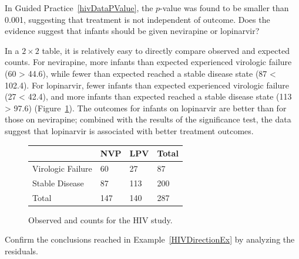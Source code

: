 
\begin{examplewrap}
\begin{nexample}{In Guided Practice~\ref{hivDataPValue}, the $p$-value was found to be smaller than 0.001, suggesting that treatment is not independent of outcome. Does the evidence suggest that infants should be given nevirapine or lopinarvir?}\label{HIVDirectionEx}%

In a $2 \times 2$ table, it is relatively easy to directly compare observed and expected counts. 
For nevirapine, more infants than expected experienced virologic failure (60 > 44.6), while fewer than expected reached a stable disease state (87 < 102.4). For lopinarvir, fewer infants than expected experienced virologic failure (27 < 42.4), and more infants than expected reached a stable disease state (113 > 97.6) (Figure~\ref{observedAndExpectedCountsForTheHivStudy}). The outcomes for infants on lopinarvir are better than for those on nevirapine; combined with the results of the significance test, the data suggest that lopinarvir is associated with better treatment outcomes.
\end{nexample}
\end{examplewrap}

\begin{figure}[h]
	\centering
	\begin{tabular}{l | l l | l}
		\hline
		& NVP & LPV & Total \\
		\hline
		Virologic Failure & 60 \highlightO{44.6} & 27 \highlightO{42.4} & 87 \\
		Stable Disease & 87 \highlightO{102.4} & 113 \highlightO{97.6}& 200 \\	
		\hline
		Total & 147 & 140 & 287 \\
		\hline
	\end{tabular}
	\caption{Observed and  counts for the HIV study.}
	\label{observedAndExpectedCountsForTheHivStudy}
\end{figure}			
		
\begin{exercisewrap}
\begin{nexercise}
Confirm the conclusions reached in Example~\ref{HIVDirectionEx} by analyzing the residuals.\footnotemark{}
\end{nexercise}
\end{exercisewrap}

